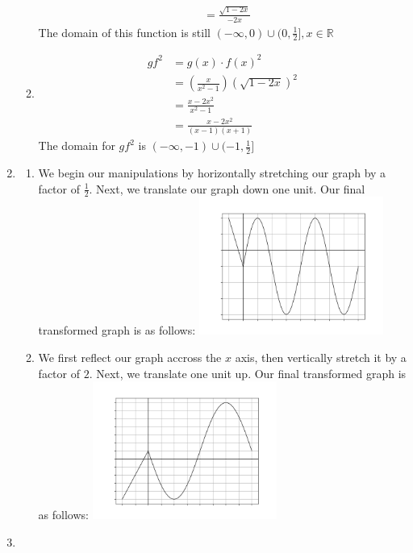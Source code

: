 \documentclass[11pt, letterpaper, twoside]{article}
\begin{document}
\begin{enumerate}
\begin{enumerate}[label=(\alph*)]
\begin{align*}
&=\frac{\sqrt{1-2x}}{-2x}
\end{align*}
The domain of this function is still $(-\infty, 0)\cup(0, \frac{1}{2}], x\in\mathbb{R}$
\item %
\begin{align*}
gf^2&=g(x)\cdot f(x)^2\\
&=\left(\frac{x}{x^2-1}\right)(\sqrt{1-2x})^2\\
&=\frac{x-2x^2}{x^2-1}\\
&=\frac{x-2x^2}{(x-1)(x+1)}
\end{align*}
The domain for $gf^2$ is $(-\infty, -1)\cup(-1, \frac{1}{2}]$
\end{enumerate}
\item \begin{enumerate}[label=(\alph*)]%
\item %
We begin our manipulations by horizontally stretching our graph by a factor of $\frac{1}{2}$. Next, we translate our graph down one unit. Our final transformed graph is as follows:
\newline \includegraphics[width=0.5\textwidth]{q4a}
\item %
We first reflect our graph accross the $x$ axis, then vertically stretch it by a factor of $2$. Next, we translate one unit up. Our final transformed graph is as follows:
\newline \includegraphics[width=0.5\textwidth]{q4b}
\end{enumerate}
\item \begin{enumerate}[label=(\alph*)]%

\end{enumerate}
\end{enumerate}
\end{document}
